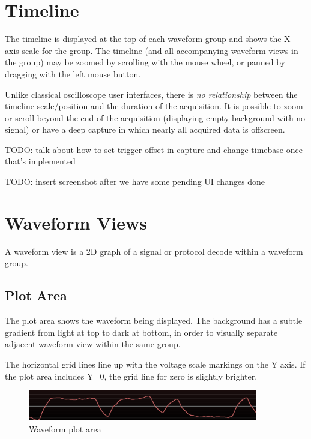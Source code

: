 \pagebreak
\section{Timeline}

The timeline is displayed at the top of each waveform group and shows the X axis scale for the group. The timeline (and
all accompanying waveform views in the group) may be zoomed by scrolling with the mouse wheel, or panned by dragging
with the left mouse button.

Unlike classical oscilloscope user interfaces, there is \emph{no relationship} between the timeline scale/position and
the duration of the acquisition. It is possible to zoom or scroll beyond the end of the acquisition (displaying empty
background with no signal) or have a deep capture in which nearly all acquired data is offscreen.

TODO: talk about how to set trigger offset in capture and change timebase once that's implemented

TODO: insert screenshot after we have some pending UI changes done

\pagebreak
\section{Waveform Views}

A waveform view is a 2D graph of a signal or protocol decode within a waveform group.

\subsection{Plot Area}

The plot area shows the waveform being displayed. The background has a subtle gradient from light at top to dark at
bottom, in order to visually separate adjacent waveform view within the same group.

The horizontal grid lines line up with the voltage scale markings on the Y axis. If the plot area includes Y=0, the
grid line for zero is slightly brighter.

\begin{figure}[H]
\centering
\includegraphics[width=10cm]{images/waveform-graph.png}
\caption{Waveform plot area}
\label{waveform-graph}
\end{figure}


